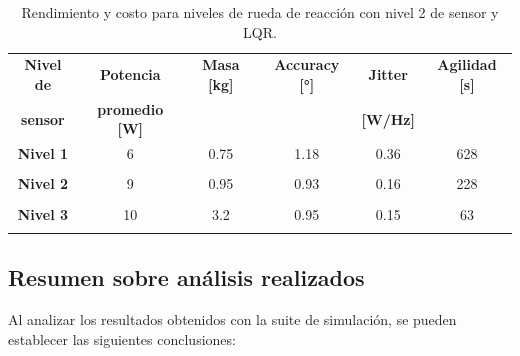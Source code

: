 \begin{table}[h!]
	\centering
	\caption{Rendimiento y costo para niveles de rueda de reacción con nivel 2 de sensor y LQR.}
	\begin{tabular}{|c|c|c|c|c|c|}
		\hline
		\textbf{Nivel de}   & \textbf{Potencia} & \textbf{Masa [kg]} & \textbf{Accuracy [°]} & \textbf{Jitter} & \textbf{Agilidad [s]}  \\ 
		\textbf{sensor}  & \textbf{promedio [W]} & & & \textbf{[W/Hz]} &  \\
		\hline
		\textbf{Nivel 1}   & 6  & 0.75  & 1.18 & 0.36 & 628  \\
		&  &   &  &  &    \\
		\hline
		\textbf{Nivel 2}   & 9  & 0.95  & 0.93 & 0.16 & 228   \\
		& & & & &   \\
		\hline
		\textbf{Nivel 3}   & 10  & 3.2  & 0.95 & 0.15 & 63   \\
		& & & & &   \\
		\hline		
	\end{tabular}
	\label{tab:RW_LQR_actuadores}
\end{table}

\subsection{Resumen sobre análisis realizados}

Al analizar los resultados obtenidos con la suite de simulación, se pueden establecer las siguientes conclusiones:

